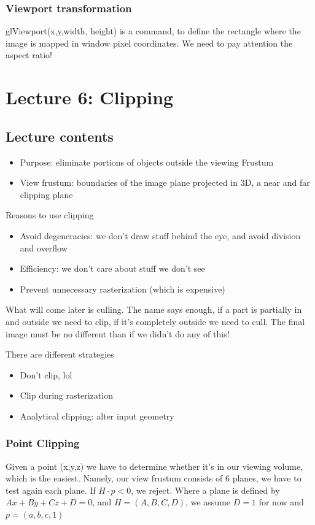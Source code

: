 \documentclass[11pt]{article}
\begin{document}

\subsubsection*{Viewport transformation}
glViewport(x,y,width, height) is a command, to define the rectangle where the image is mapped in window pixel coordinates. 
We need to pay attention the aspect ratio!




\section{Lecture 6: Clipping}
\subsection*{Lecture contents}
\begin{itemize}
    \item Purpose: eliminate portions of objects outside the viewing Frustum
    \item View frustum: boundaries of the image plane projected in 3D, a near and far clipping plane
\end{itemize}

Reasons to use clipping
\begin{itemize}
    \item Avoid degeneracies: we don't draw stuff behind the eye, and avoid division and overflow
    \item Efficiency: we don't care about stuff we don't see
    \item Prevent unnecessary rasterization (which is expensive)
\end{itemize}

What will come later is culling. The name says enough, if a part is partially in and outside we need to clip, if it's completely outside we need to cull. The final image must be no different than if we didn't do any of this!

There are different strategies
\begin{itemize}
    \item Don't clip, lol
    \item Clip during rasterization
    \item Analytical clipping: alter input geometry
\end{itemize}

\subsubsection*{Point Clipping}
Given a point (x,y,z) we have to determine whether it's in our viewing volume, which is the easiest.
Namely, our view frustum consists of 6 planes, we have to test again each plane. If $H\cdot p < 0$, we reject. Where a plane is defined by $Ax + By + Cz +D  = 0 $, and $H = (A,B,C,D)$, we assume $D = 1$ for now and $p = (a,b,c,1)$   
\end{document}
